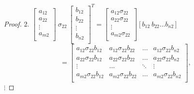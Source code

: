 \documentclass[12pt,a4paper]{report}
\begin{document}
\begin{proof}
2.
$\left[ \begin{array}{c}
         a_{12} \\
         a_{22} \\
         \vdots \\
         a_{m2} \\
         \end{array}
      \right] \: \sigma_{22} \: \left[ \begin{array}{c}
         b_{12} \\
         b_{22} \\
         \vdots \\
         b_{n2} \\
         \end{array}
      \right]^T = \left[
        \begin{array}{c}
         a_{12} \sigma_{22} \\
         a_{22} \sigma_{22} \\
         \vdots \\
         a_{m2} \sigma_{22} \\
         \end{array}
      \right] [b_{12} \: b_{22} \ldots b_{n2}]$
      $$ =  \left[
        \begin{array}{cccc}
         a_{12} \sigma_{22} b_{12}  & a_{12} \sigma_{22} b_{22} & \ldots & a_{12} \sigma_{22} b_{n2}  \\
         a_{22} \sigma_{22} b_{12} & a_{22} \sigma_{22} b_{22} & \ldots & a_{22} \sigma_{22} b_{n2} \\
         \vdots & \ldots & \ddots & \vdots \\
         a_{m2} \sigma_{22} b_{12} & a_{m2} \sigma_{22} b_{22} & \ldots & a_{m2} \sigma_{22} b_{n2} \\
         \end{array}
      \right], $$
$
\vdots
$
      

\end{proof}
\end{document}
